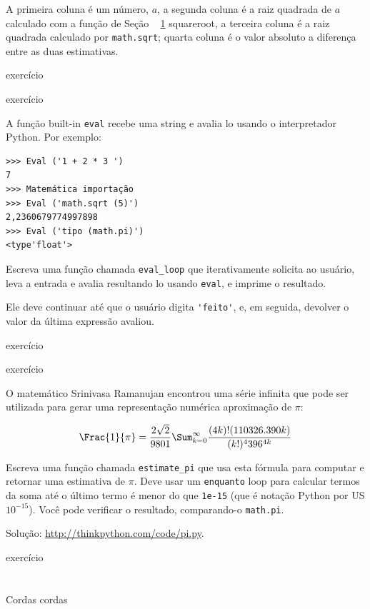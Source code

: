 \documentclass[10pt]{book}
\begin{document}
{\begin{}
\begin{verbatim}
\end{verbatim}
%
A primeira coluna é um número, $ a $, a segunda coluna é
a raiz quadrada de $ a $ calculado com a função de
Seção ~ \ref {} squareroot, a terceira coluna é a raiz quadrada calculado
por {\tt math.sqrt}; quarta coluna é o valor absoluto
a diferença entre as duas estimativas.
\end{} exercício


\begin{} exercício

A função built-in {\tt eval} recebe uma string e avalia
lo usando o interpretador Python. Por exemplo:

\begin{verbatim}
>>> Eval ('1 + 2 * 3 ')
7
>>> Matemática importação
>>> Eval ('math.sqrt (5)')
2,2360679774997898
>>> Eval ('tipo (math.pi)')
<type'float'>
\end{verbatim}
%
Escreva uma função chamada \verb "eval_loop" que iterativamente
solicita ao usuário, leva a entrada e avalia resultando
lo usando {\tt eval}, e imprime o resultado.

Ele deve continuar até que o usuário digita \verb "'feito'", e, em seguida,
devolver o valor da última expressão avaliou.

\end{} exercício


\begin{} exercício

O matemático Srinivasa Ramanujan encontrou uma
série infinita
que pode ser utilizada para gerar uma representação numérica
aproximação de $ \pi $:

\[\Frac {1} {\pi} = \frac {2 \sqrt {2}} {9801} 
\Sum ^ \infty_ {k = 0} \frac {(4k)! (1103 26.390 k)} {(k!) ^ 4 396 ^ {4k}} \]

Escreva uma função chamada \verb "estimate_pi" que usa esta fórmula
para computar e retornar uma estimativa de $ \pi $. Deve usar um {\tt enquanto}
loop para calcular termos da soma até o último termo é
menor do que {\tt 1e-15} (que é notação Python por US $ 10 ^ {-15} $).
Você pode verificar o resultado, comparando-o {\tt math.pi}.

Solução: \url{http://thinkpython.com/code/pi.py}.

\end{} exercício


\chapter{} Cordas
\label{} cordas


}
\end{document}
